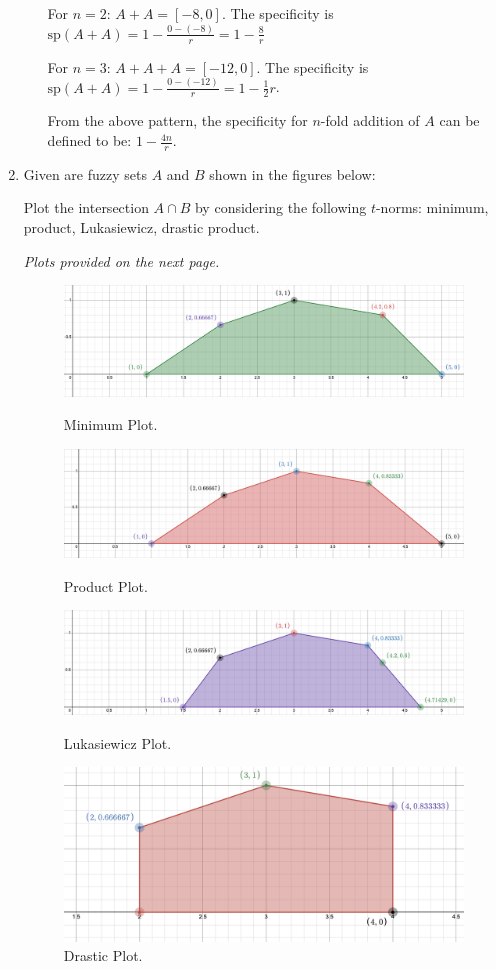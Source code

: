 \documentclass{article}
\begin{document}
\begin{enumerate}
\begin{enumerate}
		For $n = 2$: $A + A = [-8, 0]$. The specificity is $\text{sp}(A + A) = 1 - \frac{0 - (-8)}{r} = 1 - \frac 8 r$
		
		For $n = 3$: $A + A + A = [-12, 0]$. The specificity is $\text{sp}(A + A) = 1 - \frac{0 - (-12)}{r} = 1 - \frac 12 r$.
		
		From the above pattern, the specificity for $n$-fold addition of $A$ can be defined to be: $1 - \frac{4n}{r}$.
	
	\end{enumerate}
	
	\item Given are fuzzy sets $A$ and $B$ shown in the figures below:

	Plot the intersection $A \cap B$ by considering the following $t$-norms: minimum, product, Lukasiewicz, drastic product.
	
	\textit{Plots provided on the next page.}
	
	\begin{figure}[h]
		\includegraphics[width=\textwidth]{1.5_min.png}
		\caption{Minimum Plot.}
		\includegraphics[width=\textwidth]{1.5_product.png}
		\caption{Product Plot.}
		\includegraphics[width=\textwidth]{1.5_lukasiewicz.png}
		\caption{Lukasiewicz Plot.}
		\includegraphics[width=\textwidth]{1.5_drastic.png}
		\caption{Drastic Plot.}
	\end{figure}
	
\end{enumerate}
	
\end{document}
